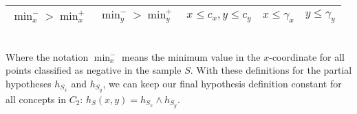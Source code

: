 \documentclass{article}
\begin{document}
\begin{enumerate}[1.]
\begin{table}[ht]
\begin{tabular}{llccc}
    			$\min_x^- > \min_x^+$ & $\min_y^- > \min_y^+$ & $x \leq c_x,y \leq c_y$ & $x \leq \gamma_x$ & $y \leq \gamma_y$ \\
    			\bottomrule
    		\end{tabular}
        \end{table}\\
        Where the notation $\min_x^-$ means the minimum value in the $x$-coordinate for all points classified as negative in the sample $S$. With these definitions for the partial hypotheses $h_{S_x}$ and $h_{S_y}$, we can keep our final hypothesis definition constant for all concepts in $C_2$: $h_S(x,y) = h_{S_x} \wedge h_{S_y}$. 
    \end{enumerate}
\end{document}
